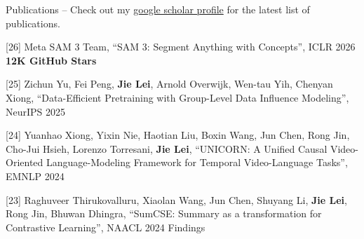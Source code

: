 \documentclass{resume} %
\begin{document}

\begin{rSection}{Publications}
    -- Check out my \href{https://scholar.google.com/citations?user=SZN9FLIAAAAJ&hl=en}{google scholar profile} for the latest list of publications.

    \item {[26]
    Meta SAM 3 Team, ``SAM 3: Segment Anything with Concepts'',
     ICLR 2026  {\color{bittersweet}\textbf{12K GitHub Stars}}
    }

    \item {[25]
    Zichun Yu, Fei Peng, \textbf{Jie Lei}, Arnold Overwijk, Wen-tau Yih, Chenyan Xiong,
    ``Data-Efficient Pretraining with Group-Level Data Influence Modeling'',
     NeurIPS 2025
    }

    \item {[24]
    Yuanhao Xiong, Yixin Nie, Haotian Liu, Boxin Wang, Jun Chen, Rong Jin, Cho-Jui Hsieh, Lorenzo Torresani, \textbf{Jie Lei},
    ``UNICORN: A Unified Causal Video-Oriented Language-Modeling Framework for Temporal Video-Language Tasks'',
     EMNLP 2024 
    }

    \item {[23]
    Raghuveer Thirukovalluru, Xiaolan Wang, Jun Chen, Shuyang Li, \textbf{Jie Lei}, Rong Jin, Bhuwan Dhingra,
    ``SumCSE: Summary as a transformation for Contrastive Learning'',
     NAACL 2024 Findings
    }


\end{rSection}
\end{document}
